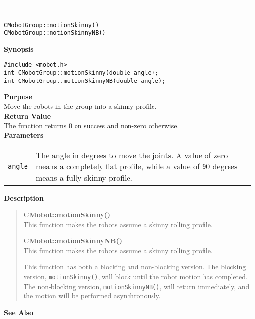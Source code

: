 \noindent
\vspace{5pt}
\rule{4.5in}{0.015in}\\
\noindent
{\LARGE \texttt{CMobotGroup::motionSkinny()}}\\
{\LARGE \texttt{CMobotGroup::motionSkinnyNB()}}\\
{}

\noindent
{\bf Synopsis}
\vspace{-8pt}
\begin{verbatim}
#include <mobot.h>
int CMobotGroup::motionSkinny(double angle);
int CMobotGroup::motionSkinnyNB(double angle);
\end{verbatim}

\noindent
{\bf Purpose}\\
Move the robots in the group into a skinny profile.\\

\noindent
{\bf Return Value}\\
The function returns 0 on success and non-zero otherwise.\\

\noindent
{\bf Parameters}\\
\vspace{-0.1in}
\begin{description}
\item               
\begin{tabular}{p{10 mm}p{145 mm}}
\texttt{angle} & The angle in degrees to move the joints. A value of zero means a
completely flat profile, while a value of 90 degrees means a fully skinny
profile.  \\
\end{tabular}
\end{description}


\noindent
{\bf Description}\\
\vspace{-12pt}
\begin{quote}
{\bf CMobot::motionSkinny()}\\
This function makes the robots assume a skinny rolling profile.

{\bf CMobot::motionSkinnyNB()}\\
This function makes the robots assume a skinny rolling profile.

This function has both a blocking and non-blocking version.
The blocking version, \texttt{motionSkinny()}, will block until the
robot motion has completed. The non-blocking version, \texttt{motionSkinnyNB()},
will return immediately, and the motion will be performed asynchronously.\\
\end{quote}

\noindent
{\bf See Also}\\

